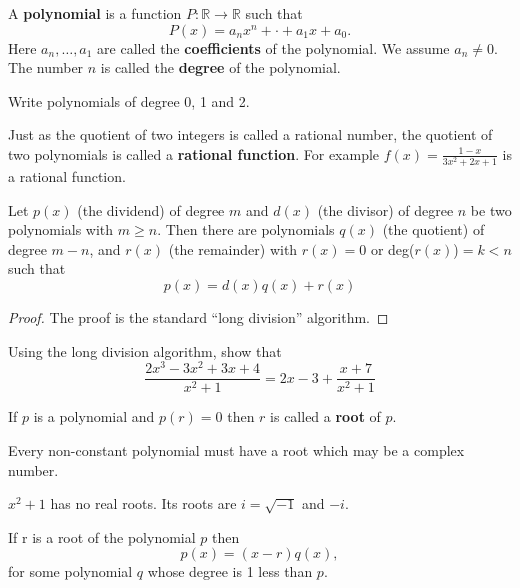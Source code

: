 \documentclass[calc1-main.tex]{subfiles}
\begin{document}
\begin{definition}
  A \textbf{polynomial} is a function $P: \mathbb{R} \to \mathbb{R}$ such that
  \[
    P(x) = a_n x^n + \cdot + a_1 x + a_0.
  \]
  Here $a_n, \dots, a_1$ are called the \textbf{coefficients} of the polynomial. We assume $a_n \neq 0$. The number $n$ is called the \textbf{degree} of the polynomial.
\end{definition}

\begin{example}
  Write polynomials of degree 0, 1 and 2.
\end{example}

Just as the quotient of two integers is called a rational number, the quotient of two polynomials is called a \textbf{rational function}. For example $f(x) = \frac{1-x}{3x^2 + 2x + 1}$ is a rational function.

\begin{theorem}
  Let $p(x)$ (the dividend) of degree $m$ and $d(x)$ (the divisor) of degree $n$ be two polynomials with $m\ge n$.
  Then there are polynomials $q(x)$ (the quotient) of degree $m-n$, and $r(x)$ (the remainder) with $r(x) = 0$ or deg($r(x)$)$=k<n$ such that
  \[
    p(x) = d(x) q(x) + r(x)
  \]
\end{theorem}
\begin{proof}
  The proof is the standard ``long division'' algorithm.
\end{proof}

\begin{example}
  Using the long division algorithm, show that
  \[
    \frac{2x^3-3x^2+3x+4}{x^2+1} = 2x-3 + \frac{x+7}{x^2+1}
  \]
\end{example}

If $p$ is a polynomial and $p(r) = 0$ then $r$ is called a \textbf{root} of $p$.

\begin{theorem}
   Every non-constant polynomial must have a root which may be a complex number.
\end{theorem}

\begin{example}
  $x^2+1$ has no real roots. Its roots are $i=\sqrt{-1}$ and $-i$.
\end{example}

\begin{theorem}
  If r is a root of the polynomial $p$ then
  \[
    p(x) = (x-r) q(x),
  \]
  for some polynomial $q$ whose degree is 1 less than $p$.
\end{theorem}
\end{document}
